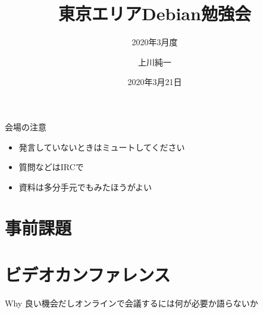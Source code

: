 \title{東京エリアDebian勉強会}
\subtitle{2020年3月度} 
\author{上川純一}
\date{2020年3月21日}



\begin{frame}
\titlepage{}
\end{frame}

\begin{frame}{会場の注意}
 \begin{itemize}
  \item 発言していないときはミュートしてください
  \item 質問などはIRCで
  \item 資料は多分手元でもみたほうがよい
 \end{itemize}
\end{frame}


\section{事前課題}


{\footnotesize
 
}

\section{ビデオカンファレンス}

\begin{frame}{Why}
良い機会だしオンラインで会議するには何が必要か語らないか
\end{frame}


